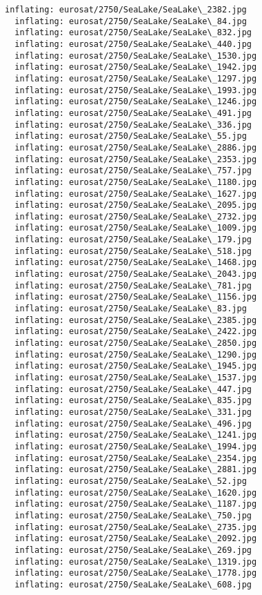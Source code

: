\documentclass[11pt]{article}
\begin{document}
\begin{Verbatim}[commandchars=\\\{\}]
  inflating: eurosat/2750/SeaLake/SeaLake\_2382.jpg
  inflating: eurosat/2750/SeaLake/SeaLake\_84.jpg
  inflating: eurosat/2750/SeaLake/SeaLake\_832.jpg
  inflating: eurosat/2750/SeaLake/SeaLake\_440.jpg
  inflating: eurosat/2750/SeaLake/SeaLake\_1530.jpg
  inflating: eurosat/2750/SeaLake/SeaLake\_1942.jpg
  inflating: eurosat/2750/SeaLake/SeaLake\_1297.jpg
  inflating: eurosat/2750/SeaLake/SeaLake\_1993.jpg
  inflating: eurosat/2750/SeaLake/SeaLake\_1246.jpg
  inflating: eurosat/2750/SeaLake/SeaLake\_491.jpg
  inflating: eurosat/2750/SeaLake/SeaLake\_336.jpg
  inflating: eurosat/2750/SeaLake/SeaLake\_55.jpg
  inflating: eurosat/2750/SeaLake/SeaLake\_2886.jpg
  inflating: eurosat/2750/SeaLake/SeaLake\_2353.jpg
  inflating: eurosat/2750/SeaLake/SeaLake\_757.jpg
  inflating: eurosat/2750/SeaLake/SeaLake\_1180.jpg
  inflating: eurosat/2750/SeaLake/SeaLake\_1627.jpg
  inflating: eurosat/2750/SeaLake/SeaLake\_2095.jpg
  inflating: eurosat/2750/SeaLake/SeaLake\_2732.jpg
  inflating: eurosat/2750/SeaLake/SeaLake\_1009.jpg
  inflating: eurosat/2750/SeaLake/SeaLake\_179.jpg
  inflating: eurosat/2750/SeaLake/SeaLake\_518.jpg
  inflating: eurosat/2750/SeaLake/SeaLake\_1468.jpg
  inflating: eurosat/2750/SeaLake/SeaLake\_2043.jpg
  inflating: eurosat/2750/SeaLake/SeaLake\_781.jpg
  inflating: eurosat/2750/SeaLake/SeaLake\_1156.jpg
  inflating: eurosat/2750/SeaLake/SeaLake\_83.jpg
  inflating: eurosat/2750/SeaLake/SeaLake\_2385.jpg
  inflating: eurosat/2750/SeaLake/SeaLake\_2422.jpg
  inflating: eurosat/2750/SeaLake/SeaLake\_2850.jpg
  inflating: eurosat/2750/SeaLake/SeaLake\_1290.jpg
  inflating: eurosat/2750/SeaLake/SeaLake\_1945.jpg
  inflating: eurosat/2750/SeaLake/SeaLake\_1537.jpg
  inflating: eurosat/2750/SeaLake/SeaLake\_447.jpg
  inflating: eurosat/2750/SeaLake/SeaLake\_835.jpg
  inflating: eurosat/2750/SeaLake/SeaLake\_331.jpg
  inflating: eurosat/2750/SeaLake/SeaLake\_496.jpg
  inflating: eurosat/2750/SeaLake/SeaLake\_1241.jpg
  inflating: eurosat/2750/SeaLake/SeaLake\_1994.jpg
  inflating: eurosat/2750/SeaLake/SeaLake\_2354.jpg
  inflating: eurosat/2750/SeaLake/SeaLake\_2881.jpg
  inflating: eurosat/2750/SeaLake/SeaLake\_52.jpg
  inflating: eurosat/2750/SeaLake/SeaLake\_1620.jpg
  inflating: eurosat/2750/SeaLake/SeaLake\_1187.jpg
  inflating: eurosat/2750/SeaLake/SeaLake\_750.jpg
  inflating: eurosat/2750/SeaLake/SeaLake\_2735.jpg
  inflating: eurosat/2750/SeaLake/SeaLake\_2092.jpg
  inflating: eurosat/2750/SeaLake/SeaLake\_269.jpg
  inflating: eurosat/2750/SeaLake/SeaLake\_1319.jpg
  inflating: eurosat/2750/SeaLake/SeaLake\_1778.jpg
  inflating: eurosat/2750/SeaLake/SeaLake\_608.jpg

\end{Verbatim}
\end{document}
